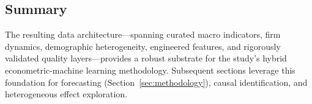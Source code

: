 \subsection{Summary}\label{subsec:data_summary}
The resulting data architecture---spanning curated macro indicators, firm dynamics, demographic heterogeneity, engineered features, and rigorously validated quality layers---provides a robust substrate for the study's hybrid econometric-machine learning methodology. Subsequent sections leverage this foundation for forecasting (Section~\ref{sec:methodology}), causal identification, and heterogeneous effect exploration.


